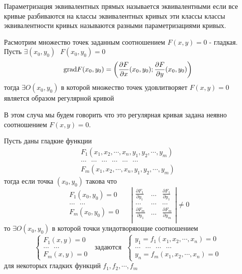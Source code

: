 Параметризация эквивалентных прямых называется эквивалентными если все кривые
разбиваются на классы эквивалентных кривых эти классы классы эквивалентности
кривых называются разными параметризациями кривых.

\begin{theorem}
  Расмотрим множество точек заданным соотношением $F(x, y) = 0$ - гладкая.
  Пусть $\exists (x_0, y_0) ~~~ F(x_0, y_0) = 0$
  $$
  \mathrm{grad} F(x_0, y_0) = \left( \frac{\partial F}{\partial x}(x_0, y_0);
  \frac{\partial F}{\partial y}(x_0, y_0) \right)
  $$
  тогда $\exists O(x_0, y_0)$ в которой множество точек удовлитворяет
  $F(x, y) = 0$ является образом регулярной кривой

  В этом случа мы будем говорить что это регулярная кривая задана неявно
  соотношением $F(x, y) = 0$.
\end{theorem}

\begin{theorem}
  Пусть  даны гладкие функции
  $$
  \begin{array}{c}
    F_1 (x_1, x_2, \cdots, x_n, y_1, y_2, \cdots, y_m) \\
    \dots ~~~ \dots ~~~ \dots ~~~ \dots  ~~~ \dots ~~~ \dots \\
    F_m (x_1, x_2, \cdots, x_n, y_1, y_2, \cdots, y_m)
  \end{array}
  $$
  тогда если точка $(x_0, y_0)$ такова что
  $$
  \begin{array}{c}
    F_1(x_0, y_0) = 0 \\
    \ldots ~~~ \ldots \\
    F_m(x_0, y_0) = 0 \\
  \end{array} ~~~~~~
  \left|
  \begin{array}{ccc}
    \frac{\partial F_1}{\partial y_1} & \dots &
    \frac{\partial F_1}{\partial y_1} \\

    \dots & \dots & \dots \\

    \frac{\partial F_m}{\partial y_1} & \dots &
    \frac{\partial F_m}{\partial y_m} \\
  \end{array}
  \right|
  \not= 0
  $$
  то $\exists O(x_0, y_0)$ в которой точки улидотворяющие соотношением
  $$
  \left\{
  \begin{array}{c}
    F_1(x, y) = 0 \\
    \dots ~~~ \dots \\
    F_m(x, y) = 0
  \end{array}
  \right. ~~~ \text{задаются} ~~~
  \left\{
  \begin{array}{c}
    y_1 = f_1(x_1, x_2, \cdots, x_n) = 0 \\
    \dots ~~~ \dots ~~~ \dots ~~~ \dots \\
    y_n = f_m(x_1, x_2, \cdots, x_n) = 0
  \end{array}
  \right.
  $$
  для некоторых гладких функций $f_1, f_2, \cdots, f_m $
\end{theorem}


